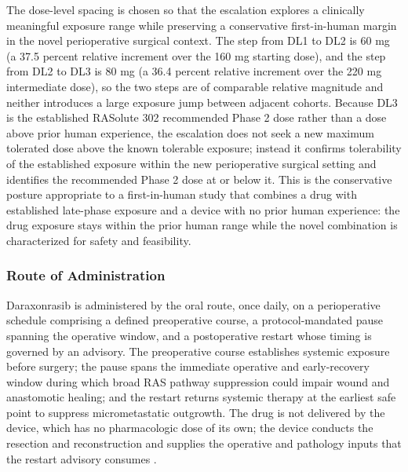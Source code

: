 The dose-level spacing is chosen so that the escalation explores a clinically
meaningful exposure range while preserving a conservative first-in-human margin in
the novel perioperative surgical context. The step from DL1 to DL2 is 60 mg (a 37.5
percent relative increment over the 160 mg starting dose), and the step from DL2 to
DL3 is 80 mg (a 36.4 percent relative increment over the 220 mg intermediate dose),
so the two steps are of comparable relative magnitude and neither introduces a large
exposure jump between adjacent cohorts. Because DL3 is the established RASolute 302
recommended Phase 2 dose rather than a dose above prior human experience, the
escalation does not seek a new maximum tolerated dose above the known tolerable
exposure; instead it confirms tolerability of the established exposure within the new
perioperative surgical setting and identifies the recommended Phase 2 dose at or
below it. This is the conservative posture appropriate to a first-in-human study
that combines a drug with established late-phase exposure and a device with no prior
human experience: the drug exposure stays within the prior human range while the
novel combination is characterized for safety and feasibility.

\subsubsection{Route of Administration}

Daraxonrasib is administered by the oral route, once daily, on a perioperative
schedule comprising a defined preoperative course, a protocol-mandated pause
spanning the operative window, and a postoperative restart whose timing is governed
by an advisory. The preoperative course establishes systemic exposure before
surgery; the pause spans the immediate operative and early-recovery window during
which broad RAS pathway suppression could impair wound and anastomotic healing; and
the restart returns systemic therapy at the earliest safe point to suppress
micrometastatic outgrowth. The drug is not delivered by the device, which has no
pharmacologic dose of its own; the device conducts the resection and reconstruction
and supplies the operative and pathology inputs that the restart advisory consumes
\cite{daraxwhipple}.

